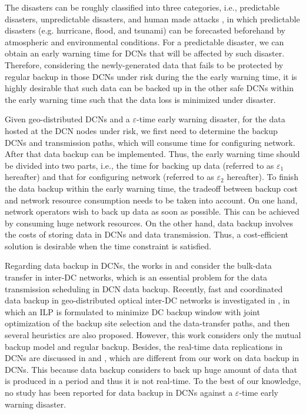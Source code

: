 \documentclass[conference]{IEEEtran}\IEEEoverridecommandlockouts
\begin{document}
The disasters can be roughly  classified into three categories, i.e., predictable disasters, unpredictable disasters, and human made attacks \cite{Mukherjee2014-1}, in which predictable disasters (e.g. hurricane, flood, and tsunami) can be forecasted beforehand by atmospheric and environmental conditions. For a predictable disaster, we can obtain an early warning time for  DCNs that will be affected by such disaster. Therefore,  considering the newly-generated data  that fails to be protected by regular backup in those DCNs under risk during the the early warning time,  it is highly desirable that such data can be backed up in the other safe DCNs within the early warning time such that the data loss is minimized under disaster.

Given  geo-distributed DCNs and  a $\varepsilon$-time early warning disaster, for the data hosted at the DCN nodes under risk, we first need to determine the backup DCNs and transmission paths, which will consume time for configuring network. After that data backup can be implemented. Thus, the early warning time should be divided into two parts, i.e., the time for backing up data (referred to as $\varepsilon_{1}$ hereafter) and that for configuring network (referred to as $\varepsilon_{2}$ hereafter).
To finish the data backup within the early warning time, the tradeoff between backup cost and network resource consumption needs to be taken into account.  On one hand, network operators wish to back up data as soon as possible. This can be achieved by consuming huge network resources. On the other hand, data backup involves the costs of storing data in DCNs and  data transmission. Thus, a cost-efficient solution is desirable when the time constraint is satisfied.


 Regarding  data backup in DCNs, the works in \cite{Laoutaris2011} and \cite{Mahimkar2011} consider the bulk-data transfer in inter-DC networks, which is  an essential problem for the  data transmission scheduling in DCN data backup. Recently, fast and coordinated data backup in geo-distributed optical inter-DC networks is investigated in \cite{Yao2015}, in which an ILP is formulated to minimize DC backup window with joint optimization of the backup site selection and the data-transfer paths, and then several heuristics are also proposed. However, this work  considers  only the mutual backup  model  and regular backup. Besides, the real-time data replications in DCNs are discussed in \cite{Boru2015} and \cite{Couto2015}, which are different from our work on  data backup in DCNs. This because data backup considers to back up huge amount of data that is produced in a period and thus it is not real-time.
 To the best of our knowledge, no study has been reported for data backup in DCNs against a $\varepsilon$-time early warning disaster.
\end{document}
